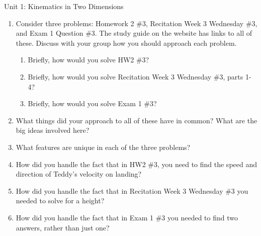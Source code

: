 \documentclass[12pt]{article}
\begin{document}
\newpage

\begin{center}
	\Large Unit 1: Kinematics in Two Dimensions
\end{center}
\begin{enumerate}
	\item Consider three problems: Homework 2 \#3, Recitation Week 3 Wednesday \#3, and Exam 1 Question \#3. The study guide on the website has links to all of these. Discuss with your group how you should approach each problem.
	
	\begin{enumerate}
		\item Briefly, how would you solve HW2 \#3? 
		\vspace{1in}
		\item Briefly, how would you solve Recitation Week 3 Wednesday \#3, parts 1-4?
		\vspace{1in}
		\item Briefly, how would you solve Exam 1 \#3?
		\vspace{1in}
	\end{enumerate}
\item What things did your approach to all of these have in common? What are the big ideas involved here?

\newpage

\item What features are unique in each of the three problems?

\vspace{3in}

\item How did you handle the fact that in HW2 \#3, you need to find the speed and direction of Teddy's velocity on landing?

\vspace{1.5in}

\item How did you handle the fact that in Recitation Week 3 Wednesday \#3 you needed to solve for a height?

\vspace{1.5in}

\item How did you handle the fact that in Exam 1 \#3 you needed to find two answers, rather than just one?
\end{enumerate}

\newpage


\newpage
\end{document}
